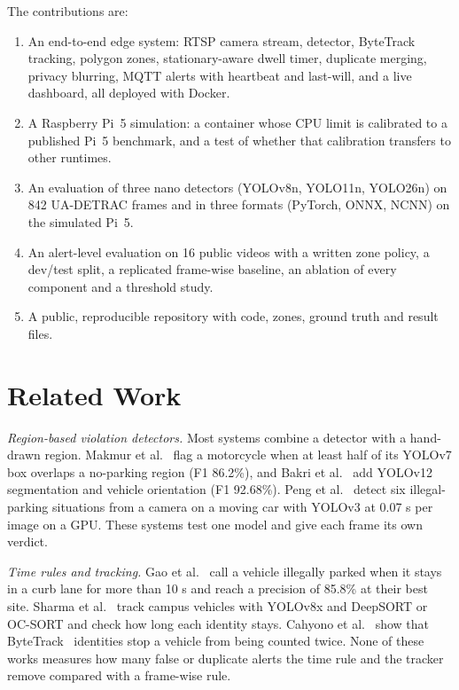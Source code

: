 \documentclass[conference]{IEEEtran}
\begin{document}
The contributions are:
\begin{enumerate}
\item An end-to-end edge system: RTSP camera stream, detector, ByteTrack tracking, polygon zones, stationary-aware dwell timer, duplicate merging, privacy blurring, MQTT alerts with heartbeat and last-will, and a live dashboard, all deployed with Docker.
\item A Raspberry Pi~5 simulation: a container whose CPU limit is calibrated to a published Pi~5 benchmark, and a test of whether that calibration transfers to other runtimes.
\item An evaluation of three nano detectors (YOLOv8n, YOLO11n, YOLO26n) on 842 UA-DETRAC frames and in three formats (PyTorch, ONNX, NCNN) on the simulated Pi~5.
\item An alert-level evaluation on 16 public videos with a written zone policy, a dev/test split, a replicated frame-wise baseline, an ablation of every component and a threshold study.
\item A public, reproducible repository with code, zones, ground truth and result files.
\end{enumerate}

\section{Related Work}
\textit{Region-based violation detectors.} Most systems combine a detector with a hand-drawn region. Makmur et al.~\cite{makmur2025} flag a motorcycle when at least half of its YOLOv7 box overlaps a no-parking region (F1 86.2\%), and Bakri et al.~\cite{bakri2026} add YOLOv12 segmentation and vehicle orientation (F1 92.68\%). Peng et al.~\cite{peng2022} detect six illegal-parking situations from a camera on a moving car with YOLOv3 at 0.07 s per image on a GPU. These systems test one model and give each frame its own verdict.

\textit{Time rules and tracking.} Gao et al.~\cite{gao2022} call a vehicle illegally parked when it stays in a curb lane for more than 10 s and reach a precision of 85.8\% at their best site. Sharma et al.~\cite{sharma2023} track campus vehicles with YOLOv8x and DeepSORT or OC-SORT and check how long each identity stays. Cahyono et al.~\cite{cahyono2026} show that ByteTrack~\cite{zhang2022bytetrack} identities stop a vehicle from being counted twice. None of these works measures how many false or duplicate alerts the time rule and the tracker remove compared with a frame-wise rule.
\end{document}
